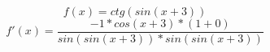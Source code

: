 \documentclass[12pt,a4paper]{article}
\begin{document}
$$f(x) = ctg(sin(x+3))$$
$$f'(x) = \frac{-1*cos(x+3)*(1+0)}{sin(sin(x+3))*sin(sin(x+3))}$$
\end{document}
